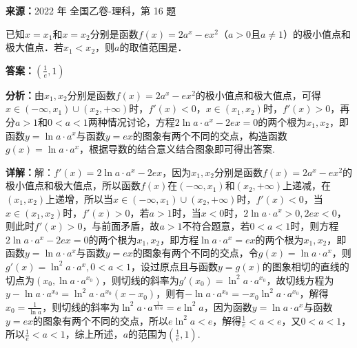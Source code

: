 \begin{question}[points=5]
\textbf{来源：}2022 年 全国乙卷-理科，第 16 题\par
已知$x=x_1$和$x=x_2$分别是函数$f(x)=2a^x - ex^2$（$a>0$且$a\neq1$）的极小值点和极大值点．若$x_1<x_2$，则$a$的取值范围是．
\begin{solution}
\textbf{答案：}$\left(\frac{1}{e},1\right)$

\textbf{分析：}由$x_1,x_2$分别是函数$f(x)=2a^x-ex^2$的极小值点和极大值点，可得$x\in(-\infty,x_1)\cup(x_2,+\infty)$时，$f'(x)<0$，$x\in(x_1,x_2)$时，$f'(x)>0$，再分$a>1$和$0<a<1$两种情况讨论，方程$2\ln a\cdot a^x - 2ex = 0$的两个根为$x_1,x_2$，即函数$y=\ln a\cdot a^x$与函数$y=ex$的图象有两个不同的交点，构造函数$g(x)=\ln a\cdot a^x$，根据导数的结合意义结合图象即可得出答案.

\textbf{详解：}解：$f'(x)=2\ln a\cdot a^x - 2ex$，因为$x_1,x_2$分别是函数$f(x)=2a^x-ex^2$的极小值点和极大值点，所以函数$f(x)$在$(-\infty,x_1)$和$(x_2,+\infty)$上递减，在$(x_1,x_2)$上递增，所以当$x\in(-\infty,x_1)\cup(x_2,+\infty)$时，$f'(x)<0$，当$x\in(x_1,x_2)$时，$f'(x)>0$，若$a>1$时，当$x<0$时，$2\ln a\cdot a^x>0, 2ex<0$，则此时$f'(x)>0$，与前面矛盾，故$a>1$不符合题意，若$0<a<1$时，则方程$2\ln a\cdot a^x - 2ex = 0$的两个根为$x_1,x_2$，即方程$\ln a\cdot a^x = ex$的两个根为$x_1,x_2$，即函数$y=\ln a\cdot a^x$与函数$y=ex$的图象有两个不同的交点，令$g(x)=\ln a\cdot a^x$，则$g'(x)=\ln^2 a\cdot a^x, 0<a<1$，设过原点且与函数$y=g(x)$的图象相切的直线的切点为$(x_0,\ln a\cdot a^{x_0})$，则切线的斜率为$g'(x_0)=\ln^2 a\cdot a^{x_0}$，故切线方程为$y-\ln a\cdot a^{x_0}=\ln^2 a\cdot a^{x_0}(x-x_0)$，则有$-\ln a\cdot a^{x_0} = -x_0\ln^2 a\cdot a^{x_0}$，解得$x_0=\frac{1}{\ln a}$，则切线的斜率为$\ln^2 a\cdot a^{\frac{1}{\ln a}} = e\ln^2 a$，因为函数$y=\ln a\cdot a^x$与函数$y=ex$的图象有两个不同的交点，所以$e\ln^2 a < e$，解得$\frac{1}{e}<a<e$，又$0<a<1$，所以$\frac{1}{e}<a<1$，综上所述，$a$的范围为$\left(\frac{1}{e},1\right)$.
\end{solution}
\end{question}

